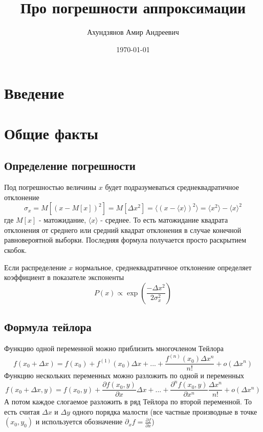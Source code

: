 \documentclass[a4paper,12pt]{article}
\begin{document}
\title{Про погрешности аппроксимации}
\author{Ахундзянов Амир Андреевич}
\date{\today}
\maketitle
\section{Введение}

\section{Общие факты}
\subsection{Определение погрешности}
Под погрешностью величины $x$ будет подразумеваться среднеквадратичное отклонение
$$ \sigma_x = M[(x-M[x])^2] = M[\Delta x^2] = \langle(x - \langle x \rangle)^2\rangle = \langle x^2\rangle - \langle x\rangle^2 $$
где $M[x]$ - матожидание, $\langle x\rangle$ - среднее.
То есть матожидание квадрата отклонения от среднего или средний квадрат отклонения в случае конечной равновероятной выборки. Последняя формула получается просто раскрытием скобок.

Если распределение $x$ нормальное, среднеквадратичное отклонение определяет коэффициент в показателе экспоненты
\[ P(x) \propto \exp \left(\frac{-\Delta x^2}{2\sigma_x^2} \right) \]
\subsection{Формула тейлора}
Функцию одной переменной можно приблизить многочленом Тейлора
$$ f(x_0 + \Delta x) = f(x_0) + f^{(1)}(x_0) \Delta x + ... + \frac{f^{(n)}(x_0) \Delta x^n}{n!} + o(\Delta x^n)$$
Функцию нескольких переменных можно разложить по одной и переменных
$$ f(x_0 + \Delta x, y) = 
f(x_0, y) + 
\frac{\partial f(x_0, y)}{\partial x} \Delta x + ... + \frac{\partial^n f(x_0, y)}{\partial x^n}\frac{ \Delta x^n}{n!} + o(\Delta x^n)$$
А потом каждое слогаемое разложить в ряд Тейлора по второй переменной. То есть считая $\Delta x$ и $\Delta y$ одного порядка малости (все частные производные в точке $(x_0, y_0)$  и используется обозначение $\partial_x f = \frac{\partial f}{\partial x}$)
\end{document}
